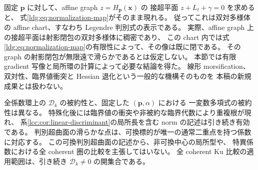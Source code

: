 \begin{remark}[双対幾何との関係と被約性の範囲]
\label{ldg:rem:duality-and-scope}
固定 $\mathbf p$ に対して、affine graph $z=H_{\mathbf p}(\mathbf x)$ の
接超平面 $z+L_\ell+\gamma=0$ を求めると、
式\eqref{ldg:eq:normalization-map}がそのまま現れる。
従ってこれは双対多様体の affine chart、すなわち Legendre 判別式の表示である。
実際、affine graph 上の接超平面は射影閉包の双対多様体に稠密であり、
この chart 内では式\eqref{ldg:eq:normalization-map}の有限性によって、その像は既に閉である。
その graph の射影閉包が無限遠で滑らかであるとは仮定しない。
本節では有限 gradient 写像と局所環の計算によって必要な結論を得た。
線形 morsification、双対性、臨界値衝突と Hessian 退化という一般的な機構そのものを
本稿の新規成果とは扱わない。

全係数環上の $\mathscr D_k$ の被約性と、固定した $(\mathbf p,\alpha)$ における
一変数多項式の被約性は異なる。
特殊化後には臨界値の衝突や非被約な臨界代数により重複根が現れ、
系\ref{lcc:cor:linear-discriminant}の局所長を含む norm の記述は引き続き有効である。
判別超曲面の滑らかな点は、可換標的が唯一の通常二重点を持つ係数に対応する。
この可換判別超曲面の記述から、非可換中心の局所型や、
特異係数における全 coherent 圏の比較を主張してはいない。
全 coherent Ku 比較の適用範囲は、引き続き $\mathscr D_k\ne0$ の開集合である。
\end{remark}
